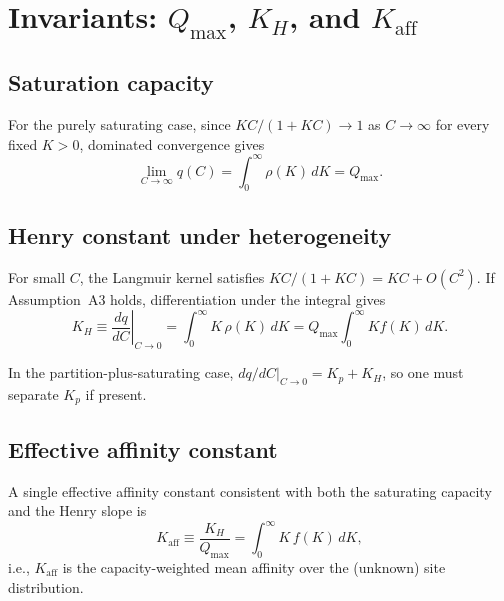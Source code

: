 \documentclass[12pt]{article}
\begin{document}
\section{Invariants: $Q_{\max}$, $K_H$, and $K_{\mathrm{aff}}$}

\subsection{Saturation capacity}

For the purely saturating case, since $KC/(1+KC)\to 1$ as
$C\to\infty$ for every fixed $K>0$, dominated convergence gives
\begin{equation}
  \lim_{C\to\infty} q(C)
  = \int_0^\infty \rho(K)\,dK = Q_{\max}.
  \label{eq:Qmax_limit}
\end{equation}

\subsection{Henry constant under heterogeneity}

For small $C$, the Langmuir kernel satisfies
$KC/(1+KC) = KC + O(C^2)$.
If Assumption~A3 holds,
differentiation under the integral gives~\cite{Jaroniec1988,Rudzinski1992}
\begin{equation}
  K_H \equiv \left.\frac{dq}{dC}\right|_{C\to 0}
  = \int_0^\infty K\,\rho(K)\,dK
  = Q_{\max}\int_0^\infty K f(K)\,dK.
  \label{eq:KH_moment}
\end{equation}

In the partition-plus-saturating case,
$dq/dC|_{C\to 0} = K_p + K_H$,
so one must separate $K_p$ if present.

\subsection{Effective affinity constant}

A single effective affinity constant consistent with both the saturating
capacity and the Henry slope is~\cite{Klotz1971,Nederlof1990}
\begin{equation}
  K_{\mathrm{aff}} \equiv \frac{K_H}{Q_{\max}}
  = \int_0^\infty K\,f(K)\,dK,
  \label{eq:Kaff_def}
\end{equation}
i.e., $K_{\mathrm{aff}}$ is the capacity-weighted mean affinity over the
(unknown) site distribution.
\end{document}
